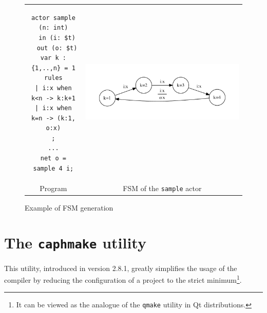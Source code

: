 \begin{figure}[h]
\begin{tabular}[c]{cc}
  \begin{minipage}[b]{0.4\linewidth}
    \begin{lstlisting}
actor sample (n: int)
  in (i: $t)
  out (o: $t)
var k : {1,..,n} = 1
rules
| i:x when k<n -> k:k+1
| i:x when k=n -> (k:1, o:x)
;
...
net o = sample 4 i;
    \end{lstlisting} 
  \end{minipage} &
  \begin{minipage}[b]{0.6\linewidth}
  \includegraphics[width=1.0\linewidth]{figs/sample-act-fsm}
  \end{minipage} \\
Program & FSM of the \texttt{sample} actor
\end{tabular}
  \caption{Example of FSM generation}
  \label{fig:sample-act-fsm}
\end{figure}

\section{The \texttt{caphmake} utility}
\label{sec:makefiles}

This utility, introduced in version 2.8.1, greatly simplifies the usage of the compiler by reducing
the configuration of a \caph project to the strict minimum\footnote{It can be viewed as the analogue
  of the \texttt{qmake} utility in \textsf{Qt} distributions.}.


